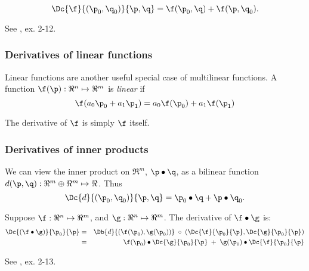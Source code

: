 \begin{equation}
\Dc{\f}{(\p_0,\q_0)}{\p,\q} = \f(\p_0,\q) + \f(\p,\q_0).
\end{equation}

See \cite{spivak-1965}, ex. 2-12.


\subsubsection{Derivatives of linear functions}
\label{sec:Derivatives-of-linear-functions}

Linear functions are another useful special case of multilinear functions.
A function $\f(\p):\Re^{n} \mapsto \Re^m$
is {\it linear} if
\begin{equation}
\f(a_0 \p_0 + a_1 \p_1)
 =
a_0 \f(\p_0) + a_1 \f(\p_1)
\end{equation}

The derivative of $\f$ is simply $\f$ itself.


\subsubsection{Derivatives of inner products}
\label{sec:inner}

We can view the inner product on $\Re^m$, $\p \bullet \q$,
as a bilinear function $d(\p,\q) : \Re^m \oplus \Re^m \mapsto \Re$.
Thus
\begin{equation}
\Dc{d}{(\p_0,\q_0)}{\p,\q} = \p_0 \bullet \q + \p \bullet \q_0.
\end{equation}

Suppose
$\f:\Re^{n} \mapsto \Re^{m}$, and
$\g:\Re^{n} \mapsto \Re^{m}$.
The derivative of $\f \bullet \g$ is:
\begin{eqnarray}
\label{eq:dot_derivative}
\Dc{(\f \bullet \g)}{\p_0}{\p}
& =
& \Db{d}{(\f(\p_0),\g(\p_0))} \;\circ \;(\Dc{\f}{\p_0}{\p}, \Dc{\g}{\p_0}{\p})
\\
& =
& \f(\p_0) \bullet \Dc{\g}{\p_0}{\p} \; + \; \g(\p_0) \bullet \Dc{\f}{\p_0}{\p} \nonumber
\end{eqnarray}

See \cite{spivak-1965}, ex. 2-13.



